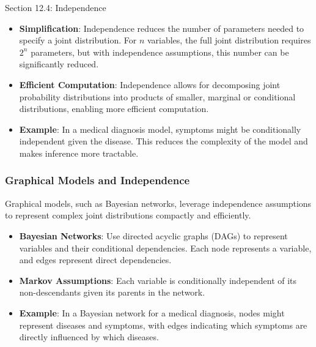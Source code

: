 \begin{notes}{Section 12.4: Independence}
    \begin{highlight}
    
        \begin{itemize}
            \item \textbf{Simplification}: Independence reduces the number of parameters needed to specify a joint distribution. For $n$ variables, the full joint distribution requires $2^n$ parameters, 
            but with independence assumptions, this number can be significantly reduced.
            \item \textbf{Efficient Computation}: Independence allows for decomposing joint probability distributions into products of smaller, marginal or conditional distributions, enabling more efficient 
            computation.
            \item \textbf{Example}: In a medical diagnosis model, symptoms might be conditionally independent given the disease. This reduces the complexity of the model and makes inference more tractable.
        \end{itemize}
    
    \end{highlight}
    
    \subsubsection*{Graphical Models and Independence}
    
    Graphical models, such as Bayesian networks, leverage independence assumptions to represent complex joint distributions compactly and efficiently.
    
    \begin{highlight}
    
        \begin{itemize}
            \item \textbf{Bayesian Networks}: Use directed acyclic graphs (DAGs) to represent variables and their conditional dependencies. Each node represents a variable, and edges represent direct 
            dependencies.
            \item \textbf{Markov Assumptions}: Each variable is conditionally independent of its non-descendants given its parents in the network.
            \item \textbf{Example}: In a Bayesian network for a medical diagnosis, nodes might represent diseases and symptoms, with edges indicating which symptoms are directly influenced by which diseases.
        \end{itemize}
    

\end{highlight}
\end{notes}
